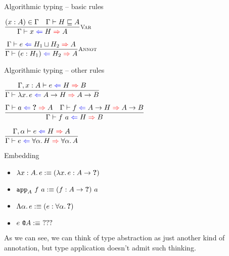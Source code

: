 \documentclass{beamer}
\begin{document}
\begin{frame}{Algorithmic typing -- basic rules}

\begin{center}
  $\infrule[Var]{\sidecond{(x : A) \in \Gamma} \quad \sidecond{\hintorderinctx{H}{A}}}{\hinting{x}{H}{A}}$

  \vspace{2em}

  $\infrule[Annot]{\hinting{e}{\hintlub{H_1}{H_2}}{A}}{\hinting{\annot{e}{H_1}}{H_2}{A}}$
\end{center}

\end{frame}

\begin{frame}{Algorithmic typing -- other rules}

\begin{center}
  $\infrule{\hinting[\extend{\Gamma}{x}{A}]{e}{H}{B}}{\hinting{\fun{x}{e}}{\Fun{A}{H}}{\Fun{A}{B}}}$

  \vspace{2em}

  $\infrule{\hinting{a}{\Hole}{A} \quad \hinting{f}{\Fun{A}{H}}{\Fun{A}{B}}}{\hinting{\app{f}{a}}{H}{B}}$

  \vspace{2em}

  $\infrule{\hinting[\extendtype{\Gamma}{\alpha}]{e}{H}{A}}{\hinting{e}{\ForallT{\alpha}{H}}{\ForallT{\alpha}{A}}}$
\end{center}

\end{frame}

\begin{frame}{Embedding}

\begin{itemize}
  \item $\fun{x}[A]{e} :\equiv \annot{\fun{x}{e}}{\Fun{A}{\Hole}}$ \\
  \item $\app[A]{f}{a} :\equiv \app{\annot{f}{\Fun{A}{\Hole}}}{a}$
  \item $\Lambda \alpha.\, e :\equiv (e : \forall \alpha.\, \textbf{?})$
  \item $\tapp{e}{A} :\equiv\ ???$
\end{itemize}

\vspace{2em}

As we can see, we can think of type abstraction as just another kind of annotation, but type application doesn't admit such thinking.

\end{frame}
\end{document}
